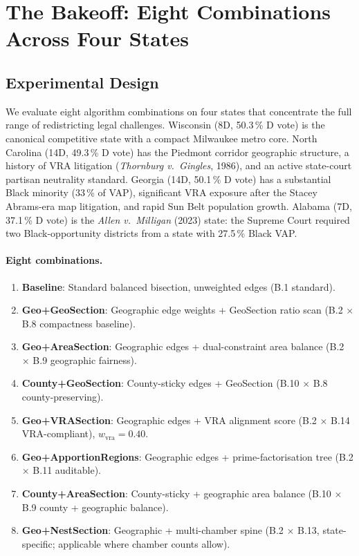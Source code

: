 \section{The Bakeoff: Eight Combinations Across Four States}
\label{sec:bakeoff}

\subsection{Experimental Design}

We evaluate eight algorithm combinations on four states that concentrate the
full range of redistricting legal challenges.
Wisconsin (8D, 50.3\,\% D vote) is the canonical competitive state with a
compact Milwaukee metro core.
North Carolina (14D, 49.3\,\% D vote) has the Piedmont corridor geographic
structure, a history of VRA litigation (\emph{Thornburg v.\ Gingles}, 1986),
and an active state-court partisan neutrality standard.
Georgia (14D, 50.1\,\% D vote) has a substantial Black minority (33\,\% of
VAP), significant VRA exposure after the Stacey Abrams-era map litigation,
and rapid Sun Belt population growth.
Alabama (7D, 37.1\,\% D vote) is the \emph{Allen v.\ Milligan} (2023) state:
the Supreme Court required two Black-opportunity districts from a state with
27.5\,\% Black VAP.

\paragraph{Eight combinations.}
\begin{enumerate}
  \item \textbf{Baseline}: Standard balanced bisection, unweighted edges
    (B.1 standard).
  \item \textbf{Geo+GeoSection}: Geographic edge weights + GeoSection ratio
    scan (B.2 $\times$ B.8 compactness baseline).
  \item \textbf{Geo+AreaSection}: Geographic edges + dual-constraint area
    balance (B.2 $\times$ B.9 geographic fairness).
  \item \textbf{County+GeoSection}: County-sticky edges + GeoSection
    (B.10 $\times$ B.8 county-preserving).
  \item \textbf{Geo+VRASection}: Geographic edges + VRA alignment score
    (B.2 $\times$ B.14 VRA-compliant), $w_\text{vra}=0.40$.
  \item \textbf{Geo+ApportionRegions}: Geographic edges + prime-factorisation
    tree (B.2 $\times$ B.11 auditable).
  \item \textbf{County+AreaSection}: County-sticky + geographic area balance
    (B.10 $\times$ B.9 county + geographic balance).
  \item \textbf{Geo+NestSection}: Geographic + multi-chamber spine
    (B.2 $\times$ B.13, state-specific; applicable where chamber counts allow).
\end{enumerate}

